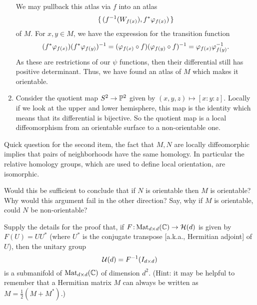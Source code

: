 \documentclass[12pt]{memoir}
\def\co{\colon}
\newcommand{\from}{\co\!\!}
\begin{document}
\begin{ptcbr}
\begin{enumerate}
	We may pullback this atlas via $f$ into an atlas 
	$$\{\,(f^{-1}(W_{f(x)}),f^\ast\varphi_{f(x)})\,\}$$ of $M$. For $x,y\in M$, we have the expression for the transition function
	$$(f^\ast\varphi_{f(x)})(f^\ast\varphi_{f(y)})^{-1}=(\varphi_{f(x)}\circ f)(\varphi_{f(y)}\circ f)^{-1}=\varphi_{f(x)}\varphi_{f(y)}^{-1}.$$
	As these are restrictions of our $\psi$ functions, then their differential still has positive determinant. Thus, we have found an atlas of $M$ which makes it orientable.
	\item Consider the quotient map $S^2\to\mathbb{P}^2$ given by $(x,y,z)\mapsto[x:y:z]$. Locally if we look at the upper and lower hemisphere, this map is the identity which means that its differential is bijective. So the quotient map is a local diffeomorphism from an orientable surface to a non-orientable one.
   \end{enumerate}

   \end{ptcbr}

   Quick question for the second item, the fact that $M,N$ are locally diffeomorphic implies that pairs of neighborhoods have the same homology. In particular the relative homology groups, which are used to define local orientation, are isomorphic.

   \begin{significant}
    Would this be sufficient to conclude that if $N$ is orientable then $M$ is orientable? Why would this argument fail in the other direction? Say, why if $M$ is orientable, could $N$ be non-orientable?
   \end{significant}

   \begin{Ej}
    Supply the details for the proof that, if $F \from \operatorname{Mat}_{d \times d}(\bC) \to \cH(d)$ is given by $F(U) = UU^*$ (where $U^*$ is the conjugate transpose [a.k.a., Hermitian adjoint] of $U$), then the unitary group
	\[
		\mathcal{U}(d) = F^{-1}(I_{d \times d})
	\]
	is a submanifold of $\operatorname{Mat}_{d \times d}(\mathbb{C})$ of dimension $d^2$. (Hint: it may be helpful to remember that a Hermitian matrix $M$ can always be written as $M = \frac{1}{2}(M + M^*)$.)
   \end{Ej}
\end{document}
